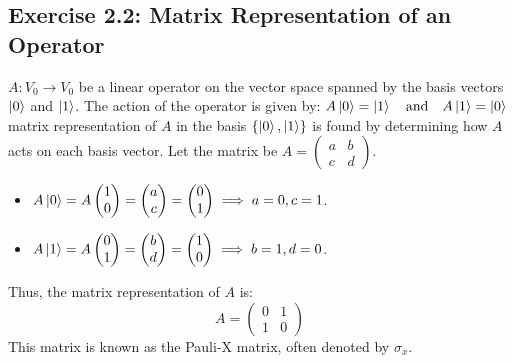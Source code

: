 \documentclass[14pt]{extarticle}
\begin{document}
\subsection*{Exercise 2.2: Matrix Representation of an Operator}
$A: V_0 \to V_0$ be a linear operator on the vector space spanned by the basis vectors $\ket{0}$ and $\ket{1}$. The action of the operator is given by:
$A\ket{0} = \ket{1} \quad \text{and} \quad A\ket{1} = \ket{0} $$
$matrix representation of $A$ in the basis $\{\ket{0}, \ket{1}\}$ is found by determining how $A$ acts on each basis vector. Let the matrix be $A = \begin{pmatrix} a & b \\ c & d \end{pmatrix}$.
\begin{itemize}
\item $A\ket{0} = A \begin{pmatrix} 1 \\ 0 \end{pmatrix} = \begin{pmatrix} a \\ c \end{pmatrix} = \begin{pmatrix} 0 \\ 1 \end{pmatrix} \implies a=0, c=1$.
\item $A\ket{1} = A \begin{pmatrix} 0 \\ 1 \end{pmatrix} = \begin{pmatrix} b \\ d \end{pmatrix} = \begin{pmatrix} 1 \\ 0 \end{pmatrix} \implies b=1, d=0$.
\end{itemize}
Thus, the matrix representation of $A$ is:
$$ A = \begin{pmatrix} 0 & 1 \\ 1 & 0 \end{pmatrix} $$
This matrix is known as the Pauli-X matrix, often denoted by $\sigma_x$.
\end{document}
